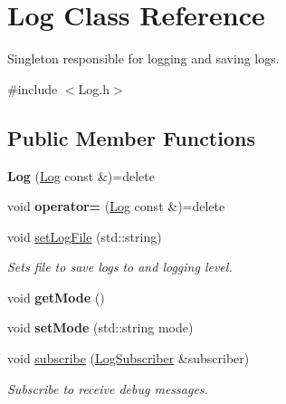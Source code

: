 \hypertarget{classLog}{\section{Log Class Reference}
\label{classLog}
}


Singleton responsible for logging and saving logs.  




{\ttfamily \#include $<$Log.\-h$>$}

\subsection*{Public Member Functions}
\begin{DoxyCompactItemize}
\item 
\hypertarget{classLog_acf321111c34203cfae64f324f2406919}{{\bfseries Log} (\hyperlink{classLog}{Log} const \&)=delete}\label{classLog_acf321111c34203cfae64f324f2406919}

\item 
\hypertarget{classLog_aa7eb1f9ae38ad5efc9f69d43d5817e8f}{void {\bfseries operator=} (\hyperlink{classLog}{Log} const \&)=delete}\label{classLog_aa7eb1f9ae38ad5efc9f69d43d5817e8f}

\item 
\hypertarget{classLog_acd3bd9bd1f52f6e2c93d7d4322c56384}{void \hyperlink{classLog_acd3bd9bd1f52f6e2c93d7d4322c56384}{set\-Log\-File} (std\-::string)}\label{classLog_acd3bd9bd1f52f6e2c93d7d4322c56384}

\begin{DoxyCompactList}\small\item\em Sets file to save logs to and logging level. \end{DoxyCompactList}\item 
\hypertarget{classLog_a966590e62c5f1691a438fb4144121a9c}{void {\bfseries get\-Mode} ()}\label{classLog_a966590e62c5f1691a438fb4144121a9c}

\item 
\hypertarget{classLog_a459deb553338454ce65be9e756f013be}{void {\bfseries set\-Mode} (std\-::string mode)}\label{classLog_a459deb553338454ce65be9e756f013be}

\item 
\hypertarget{classLog_ae8ab545617321078f7f4299dff9a9e26}{void \hyperlink{classLog_ae8ab545617321078f7f4299dff9a9e26}{subscribe} (\hyperlink{classLogSubscriber}{Log\-Subscriber} \&subscriber)}\label{classLog_ae8ab545617321078f7f4299dff9a9e26}

\begin{DoxyCompactList}\small\item\em Subscribe to receive debug messages. \end{DoxyCompactList}\end{DoxyCompactItemize}
